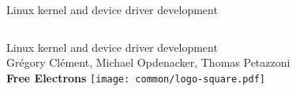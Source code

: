 \begin{frame}{Linux kernel and device driver development}
  \begin{columns}[b]
     \huge
     Linux kernel and device driver development\\
     \vspace{1cm}
     \normalsize
     Grégory Clément, Michael Opdenacker, Thomas Petazzoni\\
     {\bf Free Electrons}
     \texttt{[image: common/logo-square.pdf]}
   \end{columns}
\end{frame}
